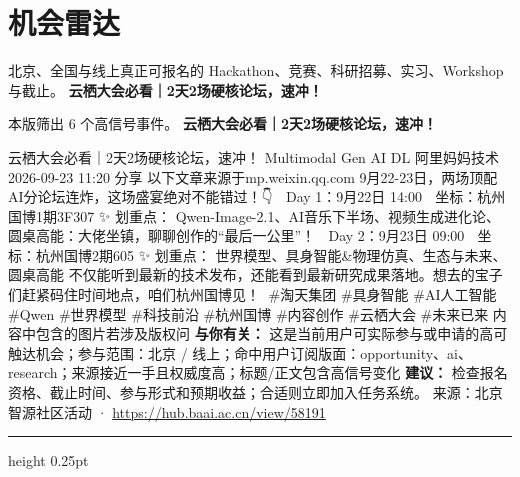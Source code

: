 \documentclass[10.5pt]{ctexart}
\begin{document}
\section*{机会雷达}
{\color{ormuted} 北京、全国与线上真正可报名的 Hackathon、竞赛、科研招募、实习、Workshop 与截止。}
\vspace{2mm}
{\LARGE\bfseries 云栖大会必看｜2天2场硬核论坛，速冲！}\par
\vspace{1mm}
{\color{ormuted} 本版筛出 6 个高信号事件。}
\vspace{3mm}
{\Large\bfseries 云栖大会必看｜2天2场硬核论坛，速冲！}\par
云栖大会必看｜2天2场硬核论坛，速冲！ Multimodal Gen AI DL 阿里妈妈技术 2026-09-23 11:20 分享 以下文章来源于mp.weixin.qq.com 9月22-23日，两场顶配AI分论坛连炸，这场盛宴绝对不能错过！👇 🎨 Day 1：9月22日 14:00 📍 坐标：杭州国博1期3F307 ✨ 划重点： Qwen-Image-2.1、AI音乐下半场、视频生成进化论、圆桌高能：大佬坐镇，聊聊创作的“最后一公里”！ 🎨 Day 2：9月23日 09:00 📍 坐标：杭州国博2期605 ✨ 划重点： 世界模型、具身智能\&物理仿真、生态与未来、圆桌高能 不仅能听到最新的技术发布，还能看到最新研究成果落地。想去的宝子们赶紧码住时间地点，咱们杭州国博见！👋 \#淘天集团 \#具身智能 \#AI人工智能 \#Qwen \#世界模型 \#科技前沿 \#杭州国博 \#内容创作 \#云栖大会 \#未来已来 内容中包含的图片若涉及版权问
\textbf{与你有关：} 这是当前用户可实际参与或申请的高可触达机会；参与范围：北京 / 线上；命中用户订阅版面：opportunity、ai、research；来源接近一手且权威度高；标题/正文包含高信号变化
\textbf{建议：} 检查报名资格、截止时间、参与形式和预期收益；合适则立即加入任务系统。
{\footnotesize\color{ormuted} 来源：北京智源社区活动 · \url{https://hub.baai.ac.cn/view/58191}}
\vspace{4mm}
\hrule height 0.25pt
\vspace{3mm}
\end{document}
